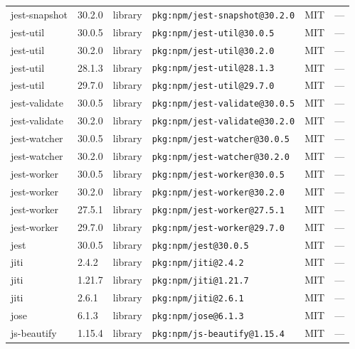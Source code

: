 \documentclass[11pt,a4paper]{article}
\begin{document}
\begin{longtable}{|p{4cm}|p{2cm}|p{1.6cm}|p{5cm}|p{1.5cm}|p{3.5cm}|}
\raggedright jest-snapshot & 30.2.0 & library & \small\texttt{pkg:npm/jest-snapshot@30.2.0} & MIT & \small — \\
\raggedright jest-util & 30.0.5 & library & \small\texttt{pkg:npm/jest-util@30.0.5} & MIT & \small — \\
\raggedright jest-util & 30.2.0 & library & \small\texttt{pkg:npm/jest-util@30.2.0} & MIT & \small — \\
\raggedright jest-util & 28.1.3 & library & \small\texttt{pkg:npm/jest-util@28.1.3} & MIT & \small — \\
\raggedright jest-util & 29.7.0 & library & \small\texttt{pkg:npm/jest-util@29.7.0} & MIT & \small — \\
\raggedright jest-validate & 30.0.5 & library & \small\texttt{pkg:npm/jest-validate@30.0.5} & MIT & \small — \\
\raggedright jest-validate & 30.2.0 & library & \small\texttt{pkg:npm/jest-validate@30.2.0} & MIT & \small — \\
\raggedright jest-watcher & 30.0.5 & library & \small\texttt{pkg:npm/jest-watcher@30.0.5} & MIT & \small — \\
\raggedright jest-watcher & 30.2.0 & library & \small\texttt{pkg:npm/jest-watcher@30.2.0} & MIT & \small — \\
\raggedright jest-worker & 30.0.5 & library & \small\texttt{pkg:npm/jest-worker@30.0.5} & MIT & \small — \\
\raggedright jest-worker & 30.2.0 & library & \small\texttt{pkg:npm/jest-worker@30.2.0} & MIT & \small — \\
\raggedright jest-worker & 27.5.1 & library & \small\texttt{pkg:npm/jest-worker@27.5.1} & MIT & \small — \\
\raggedright jest-worker & 29.7.0 & library & \small\texttt{pkg:npm/jest-worker@29.7.0} & MIT & \small — \\
\raggedright jest & 30.0.5 & library & \small\texttt{pkg:npm/jest@30.0.5} & MIT & \small — \\
\raggedright jiti & 2.4.2 & library & \small\texttt{pkg:npm/jiti@2.4.2} & MIT & \small — \\
\raggedright jiti & 1.21.7 & library & \small\texttt{pkg:npm/jiti@1.21.7} & MIT & \small — \\
\raggedright jiti & 2.6.1 & library & \small\texttt{pkg:npm/jiti@2.6.1} & MIT & \small — \\
\raggedright jose & 6.1.3 & library & \small\texttt{pkg:npm/jose@6.1.3} & MIT & \small — \\
\raggedright js-beautify & 1.15.4 & library & \small\texttt{pkg:npm/js-beautify@1.15.4} & MIT & \small — \\

\end{longtable}
\end{document}
